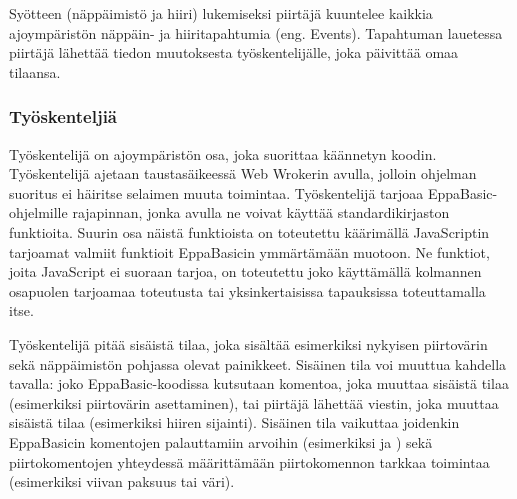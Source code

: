 Syötteen (näppäimistö ja hiiri) lukemiseksi
piirtäjä kuuntelee kaikkia ajoympäristön
näp\-päin- ja hiiritapahtumia (eng. Events).
Tapahtuman lauetessa piirtäjä
lähettää tiedon muutoksesta työskentelijälle,
joka päivittää omaa tilaansa.

\subsubsection{Työskenteljiä}
Työskentelijä on ajoympäristön osa,
joka suorittaa käännetyn koodin.
Työskentelijä ajetaan taustasäikeessä
Web Wrokerin avulla, jolloin ohjelman
suoritus ei häiritse selaimen muuta toimintaa.
Työskentelijä tarjoaa EppaBasic-ohjelmille
rajapinnan, jonka avulla ne voivat käyttää
standardikirjaston funktioita.
Suurin osa näistä funktioista on toteutettu
käärimällä JavaScriptin tarjoamat valmiit
funktioit EppaBasicin ymmärtämään muotoon.
Ne funktiot, joita JavaScript ei suoraan tarjoa,
on toteutettu joko käyttämällä kolmannen osapuolen
tarjoamaa toteutusta tai yksinkertaisissa
tapauksissa toteuttamalla itse.

Työskentelijä pitää sisäistä tilaa,
joka sisältää esimerkiksi nykyisen piirtovärin
sekä näppäimistön pohjassa olevat painikkeet.
Sisäinen tila voi muuttua kahdella tavalla:
joko EppaBasic-koodissa kutsutaan komentoa,
joka muuttaa sisäistä tilaa
(esimerkiksi piirtovärin asettaminen),
tai piirtäjä lähettää viestin,
joka muuttaa sisäistä tilaa
(esimerkiksi hiiren sijainti).
Sisäinen tila vaikuttaa joidenkin
EppaBasicin komentojen palauttamiin arvoihin
(esimerkiksi  ja )
sekä piirtokomentojen yhteydessä määrittämään
piirtokomennon tarkkaa toimintaa
(esimerkiksi viivan paksuus tai väri).


